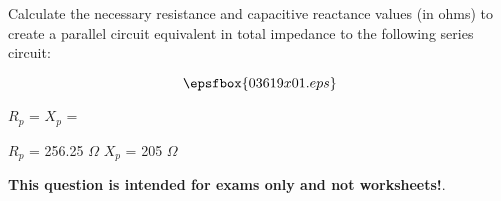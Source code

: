 

Calculate the necessary resistance and capacitive reactance values (in ohms) to create a parallel circuit equivalent in total impedance to the following series circuit:

$$\epsfbox{03619x01.eps}$$

\vskip 10pt

$R_p$ = \hskip 150pt $X_p$ = 







$R_p$ = 256.25 $\Omega$ \hskip 100pt $X_p$ = 205 $\Omega$







{\bf This question is intended for exams only and not worksheets!}.



